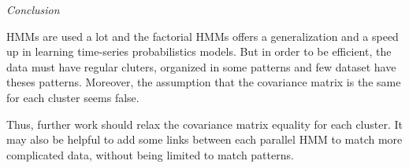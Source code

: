 \documentclass[10pt,a4paper]{report}
\begin{document}
\vspace{30pt}
\begin{center}
	\Huge{\textit{Conclusion}}
\end{center}
\vspace{20pt}

HMMs are used a lot and the factorial HMMs offers a generalization and a speed up in learning time-series probabilistics models. But in order to be efficient, the data must have regular cluters, organized in some patterns and few dataset have theses patterns. Moreover, the assumption that the covariance matrix is the same for each cluster seems false.
\newline

Thus, further work should relax the covariance matrix equality for each cluster. It may also be helpful to add some links between each parallel HMM to match more complicated data, without being limited to match patterns.

\end{document}
